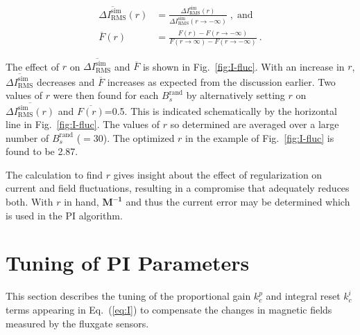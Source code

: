 \begin{align}
    \overline{\Delta I_{\text{RMS}}^{\text{sim}}}(r) &= \frac{\Delta I_{\text{RMS}}^{\text{sim}}(r)}{\Delta I_{\text{RMS}}^{\text{sim}}(r\rightarrow - \infty)} \;\mathrm{,\;and}\label{eq:Inorm}\\
    \overline{F}(r) &= \frac{F(r)- F(r\rightarrow - \infty)}{F(r\rightarrow \infty)- F(r\rightarrow - \infty)}~\text{.}\label{eq:flucNorm}
\end{align}


The effect of $r$ on $\overline{\Delta I_{\text{RMS}}^{\text{sim}}}$ and $\overline{F}$ is shown in Fig.~\ref{fig:I-fluc}. With an increase in $r$, $\overline{\Delta I_{\text{RMS}}^{\text{sim}}}$ decreases and $\overline{F}$ increases as expected from the discussion earlier.
Two values of $r$ were then found for each $B_s^{\text{rand}}$ by alternatively setting $r$ on $\overline{\Delta I_{\text{RMS}}^{\text{sim}}(r)}$ and $\overline{F(r)}$=0.5. This is indicated schematically by the horizontal line in Fig.~\ref{fig:I-fluc}. The values of $r$ so determined are averaged over a large number of $B_s^{\text{rand}}$ ($=30$). The optimized $r$ in the example of Fig.~\ref{fig:I-fluc} is found to be 2.87.


The calculation to find $r$ gives insight about the effect of regularization on current and field fluctuations, resulting in a compromise that adequately reduces both. With $r$ in hand, $\bm{M^{-1}}$ and thus the current error may be determined which is used in the PI algorithm.

\section{Tuning of PI Parameters}\label{sec:tune}
This section describes the tuning of the proportional gain $k_c^p$ and integral reset $k_c^i$ terms appearing in Eq.~(\ref{eq:I}) to compensate the changes in magnetic fields measured by the fluxgate sensors.

